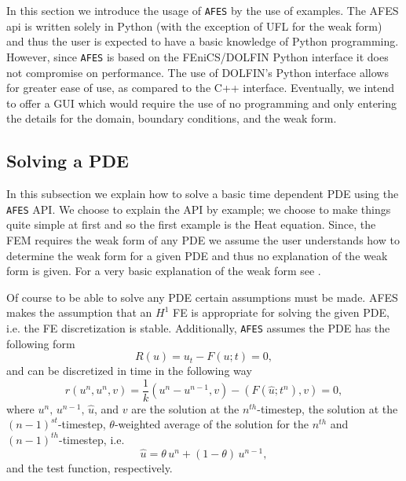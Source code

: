 In this section we introduce the usage of \texttt{AFES} by the use of examples. The AFES
api is written solely in Python (with the exception of UFL for the weak form)
and thus the user is expected to have a basic knowledge of Python programming.
However, since \texttt{AFES} is based on the FEniCS/DOLFIN Python interface it does not
compromise on performance\cite{Alnae2011}. The use of DOLFIN's Python interface
allows for greater ease of use, as compared to the C++ interface. Eventually, we
intend to offer a GUI which would require the use of no programming and only
entering the details for the domain, boundary conditions, and the weak form.

\subsection{Solving a PDE} \label{sse:Solver}

    In this subsection we explain how to solve a basic time dependent PDE using
    the \texttt{AFES} API. We choose to explain the API by example; we choose to
    make things quite simple at first and so the first example is the Heat
    equation.  Since, the FEM requires the weak form of any PDE we assume
    the user understands how to determine the weak form for a given PDE and thus
    no explanation of the weak form is given. For a very basic explanation of
    the weak form see \cite[Chapter 6.2.2]{Eriksson2009}.

    Of course to be able to solve any PDE certain assumptions must be made. AFES
    makes the assumption that an $H^1$ FE is appropriate for solving the given
    PDE, i.e. the FE discretization is stable. Additionally, \texttt{AFES} assumes the
    PDE has the following form
    \begin{equation}
        R(u) = u_t - F(u;t) = 0,
        \label{eq:BasicForm}
    \end{equation}
    and can be discretized in time in the following way
    \begin{equation}
        r(u^n, u^n, v) = \frac{1}{k} (u^n - u^{n-1}, v) - (F(\hat{u};t^n), v) = 0,
        \label{eq:WeakResidual}
    \end{equation}
    where $u^n,\, u^{n-1},\, \hat{u}$, and $v$ are the solution at the
    $n^{th}$-timestep, the solution at the $(n-1)^{st}$-timestep,
    $\theta$-weighted average of the solution for the $n^{th}$ and
    $(n-1)^{th}$-timestep, i.e.
    \begin{equation}
        \hat{u} = \theta\, u^n + (1 - \theta)\, u^{n-1},
        \label{eq:uAvg}
    \end{equation}
    and the test function, respectively.

